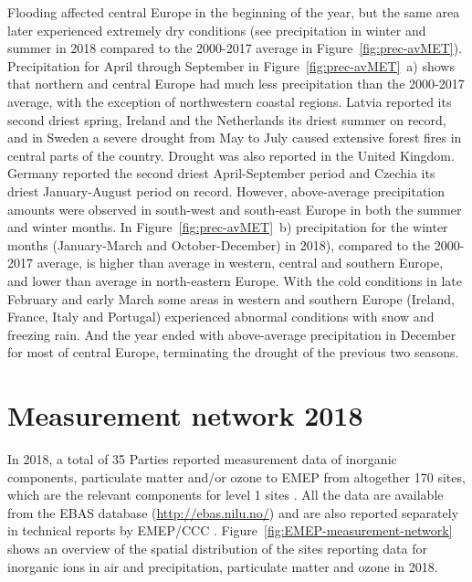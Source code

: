 Flooding affected central Europe in the beginning of the year, but the same area later experienced extremely dry conditions (see precipitation in winter and summer in 2018 compared to the 2000-2017 average in Figure~\ref{fig:prec-avMET}). Precipitation for April through September in Figure~\ref{fig:prec-avMET}~a) shows that northern and central Europe had much less precipitation than the 2000-2017 average, with the exception of northwestern coastal regions. Latvia reported its second driest spring, Ireland and the Netherlands its driest summer on record, and in Sweden a severe drought from May to July caused extensive forest fires in central parts of the country. Drought was also reported in the United Kingdom. Germany reported the second driest April-September period and Czechia its driest January-August period on record.
However, above-average precipitation amounts were observed in south-west and south-east Europe in both the summer and winter months. In Figure~\ref{fig:prec-avMET}~b) precipitation for the winter months (January-March and October-December) in 2018), compared to the 2000-2017 average, is higher than average in western, central and southern Europe, and lower than average in north-eastern Europe. With the cold conditions in late February and early March some areas in western and southern Europe (Ireland, France, Italy and Portugal) experienced abnormal conditions with snow and freezing rain. And the year ended with above-average precipitation in December for most of central Europe, terminating the drought of the previous two seasons.


\section{Measurement network 2018} 
\label{Obs_2018}

In 2018, a total of 35 Parties reported measurement data of inorganic components, particulate matter and/or ozone to EMEP from altogether 170 sites, which are the relevant components for level 1 sites \citep{MonStrat2019}. 
All the data are available from the EBAS database (\url{http://ebas.nilu.no/}) and are also reported separately in technical reports by EMEP/CCC \citep{Hjellbrekke2020a,Hjellbrekke2020b}. Figure~\ref{fig:EMEP-measurement-network} shows an overview of the spatial distribution of the sites reporting data for inorganic ions in air and precipitation, particulate matter and ozone in 2018.

